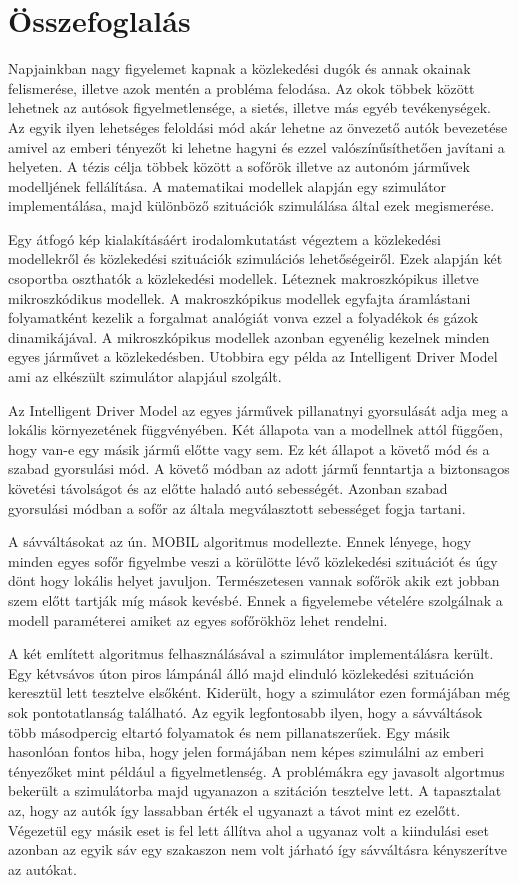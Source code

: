 \chapter*{Összefoglalás}
Napjainkban nagy figyelemet kapnak a közlekedési dugók és annak okainak felismerése, illetve azok mentén a probléma felodása. Az okok többek között lehetnek az autósok figyelmetlensége, a sietés, illetve más egyéb tevékenységek. Az egyik ilyen lehetséges feloldási mód akár lehetne az önvezető autók bevezetése amivel az emberi tényezőt ki lehetne hagyni és ezzel valószínűsíthetően javítani a helyeten. A tézis célja többek között a sofőrök illetve az autonóm járművek modelljének fellálítása. A matematikai modellek alapján egy szimulátor implementálása, majd különböző szituációk szimulálása által ezek megismerése.

Egy átfogó kép kialakításáért irodalomkutatást végeztem a közlekedési modellekről és közlekedési szituációk szimulációs lehetőségeiről. Ezek alapján két csoportba oszthatók a közlekedési modellek. Léteznek makroszkópikus illetve mikroszkódikus modellek. A makroszkópikus modellek egyfajta áramlástani folyamatként kezelik a forgalmat analógiát vonva ezzel a folyadékok és gázok dinamikájával. A mikroszkópikus modellek azonban egyenélig kezelnek minden egyes járművet a közlekedésben. Utobbira egy példa az Intelligent Driver Model ami az elkészült szimulátor alapjául szolgált.

Az Intelligent Driver Model az egyes járművek pillanatnyi gyorsulását adja meg a lokális környezetének függvényében. Két állapota van a modellnek attól függően, hogy van-e egy másik jármű előtte vagy sem. Ez két állapot a követő mód és a szabad gyorsulási mód. A követő módban az adott jármű fenntartja a biztonsagos követési távolságot és az előtte haladó autó sebességét. Azonban szabad gyorsulási módban a sofőr az általa megválasztott sebességet fogja tartani.

A sávváltásokat az ún. MOBIL algoritmus modellezte. Ennek lényege, hogy minden egyes sofőr figyelmbe veszi a körülötte lévő közlekedési szituációt és úgy dönt hogy lokális helyet javuljon. Természetesen vannak sofőrök akik ezt jobban szem előtt tartják míg mások kevésbé. Ennek a figyelemebe vételére szolgálnak a modell paraméterei amiket az egyes sofőrökhöz lehet rendelni.

A két említett algoritmus felhasználásával a szimulátor implementálásra került. Egy kétvsávos úton piros lámpánál álló majd elinduló közlekedési szituáción keresztül lett tesztelve elsőként. Kiderült, hogy a szimulátor ezen formájában még sok pontotatlanság található. Az egyik legfontosabb ilyen, hogy a sávváltások több másodpercig eltartó folyamatok és nem pillanatszerűek.  Egy másik hasonlóan fontos hiba, hogy jelen formájában nem képes szimulálni az emberi tényezőket mint például a figyelmetlenség. A problémákra egy javasolt algortmus bekerült a szimulátorba majd ugyanazon a szitáción tesztelve lett. A tapasztalat az, hogy az autók így lassabban érték el ugyanazt a távot mint ez ezelőtt. Végezetül egy másik eset is fel lett állítva ahol a ugyanaz volt a kiindulási eset azonban az egyik sáv egy szakaszon nem volt járható így sávváltásra kényszerítve az autókat.

